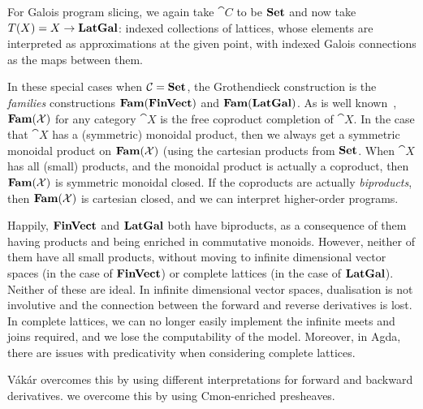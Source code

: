 For Galois program slicing, we again take $\cat{C}$ to be $\mathbf{Set}$ and now take $T(X) = X \to \mathbf{LatGal}$: indexed collections of lattices, whose elements are interpreted as approximations at the given point, with indexed Galois connections as the maps between them.

In these special cases when $\mathcal{C} = \mathbf{Set}$, the Grothendieck construction is the {\em families} constructions $\mathbf{Fam}(\mathbf{FinVect})$ and $\mathbf{Fam}(\mathbf{LatGal})$. As is well known~\cite{lawvere63}, $\mathbf{Fam}(\mathcal{X})$ for any category $\cat{X}$ is the free coproduct completion of $\cat{X}$. In the case that $\cat{X}$ has a (symmetric) monoidal product, then we always get a symmetric monoidal product on $\mathbf{Fam}(\mathcal{X})$ (using the cartesian products from $\mathbf{Set}$. When $\cat{X}$ has all (small) products, and the monoidal product is actually a coproduct, then $\mathbf{Fam}(\mathcal{X})$ is symmetric monoidal closed. If the coproducts are actually {\em biproducts}, then $\mathbf{Fam}(\mathcal{X})$ is cartesian closed, and we can interpret higher-order programs.


Happily, $\mathbf{FinVect}$ and $\mathbf{LatGal}$ both have biproducts, as a consequence of them having products and being enriched in commutative monoids. However, neither of them have all small products, without moving to infinite dimensional vector spaces (in the case of $\mathbf{FinVect}$) or complete lattices (in the case of $\mathbf{LatGal}$). Neither of these are ideal. In infinite dimensional vector spaces, dualisation is not involutive and the connection between the forward and reverse derivatives is lost. In complete lattices, we can no longer easily implement the infinite meets and joins required, and we lose the computability of the model. Moreover, in Agda, there are issues with predicativity when considering complete lattices.

Vákár overcomes this by using different interpretations for forward and backward derivatives. we overcome this by using Cmon-enriched presheaves.
